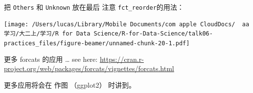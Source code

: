 \documentclass[ignorenonframetext,]{beamer}
\newenvironment{Shaded}{\begin{snugshade}}{\end{snugshade}}
\newcommand{\AttributeTok}[1]{\textcolor[rgb]{0.13,0.29,0.53}{#1}}
\newcommand{\DocumentationTok}[1]{\textcolor[rgb]{0.56,0.35,0.01}{\textbf{\textit{#1}}}}
\newcommand{\FunctionTok}[1]{\textcolor[rgb]{0.13,0.29,0.53}{\textbf{#1}}}
\newcommand{\NormalTok}[1]{#1}
\newcommand{\OtherTok}[1]{\textcolor[rgb]{0.56,0.35,0.01}{#1}}
\newcommand{\SpecialCharTok}[1]{\textcolor[rgb]{0.81,0.36,0.00}{\textbf{#1}}}
\newcommand{\StringTok}[1]{\textcolor[rgb]{0.31,0.60,0.02}{#1}}
\newcommand\FontSmall{\fontsize{7}{8}\selectfont}
\begin{document}
\begin{frame}[fragile]{把 \texttt{Others} 和 \texttt{Unknown} 放在最后}
\protect\hypertarget{ux628a-others-ux548c-unknown-ux653eux5728ux6700ux540e}{}
注意 \texttt{fct\_reorder}的用法：

\FontSmall

\begin{Shaded}
\end{Shaded}

\texttt{[image: /Users/lucas/Library/Mobile Documents/com~apple~CloudDocs/~~aa学习/大二上/学习/R for Data Science/R-for-Data-Science/talk06-practices\_files/figure-beamer/unnamed-chunk-20-1.pdf]}
\end{frame}

\begin{frame}{更多 forcats 的应用 \ldots{}}
\protect\hypertarget{ux66f4ux591a-forcats-ux7684ux5e94ux7528}{}
see here:
\url{https://cran.r-project.org/web/packages/forcats/vignettes/forcats.html}

更多应用将会在 作图 （ggplot2） 时讲到。
\end{frame}
\end{document}
